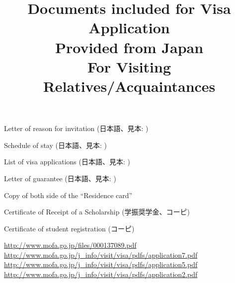 \documentclass[12pt]{article} %
\title{Documents included for Visa Application\\Provided from Japan\\For Visiting Relatives/Acquaintances}
\newcommand{\cmark}{\ding{51}}%
\newcommand{\done}{\rlap{$\square$}{\raisebox{2pt}{\large\hspace{1pt}\cmark}}%
\hspace{-2.5pt}}
\begin{document}
\maketitle
\begin{todolist}
	\item Letter of reason for invitation (日本語、見本: \cite{reasonletter})
	\item Schedule of stay (日本語、見本: \cite{schedule})
	\item List of visa applications (日本語、見本: \cite{applicantlist})
	\item Letter of guarantee (日本語、見本: \cite{guarantee})
	\item Copy of both side of the ``Residence card'' 
	\item Certificate of Receipt of a Scholarship (学振奨学金、コーピ)
	\item Certificate of student registration (コーピ)
\end{todolist}

\begin{thebibliography}{9}
	\url{http://www.mofa.go.jp/files/000137089.pdf}
	\url{http://www.mofa.go.jp/j_info/visit/visa/pdfs/application7.pdf}
	\url{http://www.mofa.go.jp/j_info/visit/visa/pdfs/application5.pdf}
	\url{http://www.mofa.go.jp/j_info/visit/visa/pdfs/application2.pdf}
\end{thebibliography}
\end{document}
